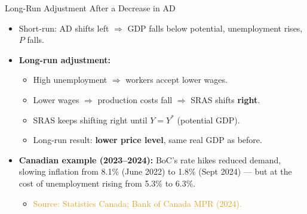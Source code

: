 \documentclass[aspectratio=169]{beamer}
\begin{document}
\begin{frame}{Long-Run Adjustment After a Decrease in AD}
\transfade
\begin{itemize}
  \item Short-run: AD shifts left $\Rightarrow$ GDP falls below potential, unemployment rises, $P$ falls.
  \item \textbf{Long-run adjustment:}
  \begin{itemize}
    \item High unemployment $\Rightarrow$ workers accept lower wages.
    \item Lower wages $\Rightarrow$ production costs fall $\Rightarrow$ SRAS shifts \textbf{right}.
    \item SRAS keeps shifting right until $Y = Y^*$ (potential GDP).
    \item Long-run result: \textbf{lower price level}, same real GDP as before.
  \end{itemize}
  \item \textbf{Canadian example (2023--2024):} BoC's rate hikes reduced demand, slowing inflation from 8.1\% (June 2022) to \alert{1.8\%} (Sept 2024) --- but at the cost of unemployment rising from 5.3\% to 6.3\%.
  \begin{itemize}
    \item \textcolor{goldenrod}{Source: Statistics Canada; Bank of Canada MPR (2024).}
  \end{itemize}
\end{itemize}
\end{frame}
\end{document}
